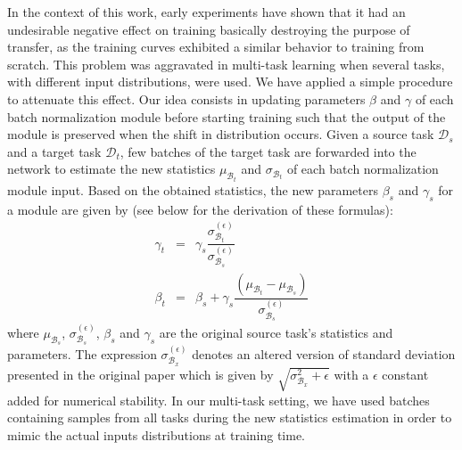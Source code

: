 In the context of this work, early experiments have shown that it had an undesirable negative effect on training basically destroying the purpose of transfer, as the training curves exhibited a similar behavior to training from scratch. This problem was aggravated in multi-task learning when several tasks, with different input distributions, were used. We have applied a simple procedure to attenuate this effect. Our idea consists in updating parameters $\beta$ and $\gamma$ of each batch normalization module before starting training such that the output of the module is preserved when the shift in distribution occurs. Given a source task $\mathcal{D}_s$ and a target task $\mathcal{D}_t$, few batches of the target task are forwarded into the network to estimate the new statistics $\mu_{\mathcal{B}_t}$ and $\sigma_{\mathcal{B}_t}$ of each batch normalization module input. Based on the obtained statistics, the new parameters $\beta_s$ and $\gamma_s$ for a module are given by (see below for the derivation of these formulas):
\begin{eqnarray}
\gamma_t &=& \gamma_s \dfrac{\sigma^{(\epsilon)}_{\mathcal{B}_t}}{\sigma^{(\epsilon)}_{\mathcal{B}_s}}\label{app:mtask:eqn:bn_update_gamma}\\
\beta_t &=& \beta_s + \gamma_s  \dfrac{(\mu_{\mathcal{B}_t}-\mu_{\mathcal{B}_s})}{\sigma^{(\epsilon)}_{\mathcal{B}_s}}\label{app:mtask:eqn:bn_update_beta}
\end{eqnarray}
where $\mu_{\mathcal{B}_s}$, $\sigma^{(\epsilon)}_{\mathcal{B}_s}$, $\beta_s$ and $\gamma_s$ are the original source task's statistics and parameters. The expression $\sigma^{(\epsilon)}_{\mathcal{B}_x}$ denotes an altered version of standard deviation presented in the original paper which is given by $\sqrt{\sigma_{\mathcal{B}_x}^2 + \epsilon}$ with a $\epsilon$ constant added for numerical stability. In our multi-task setting, we have used batches containing samples from all tasks during the new statistics estimation in order to mimic the actual inputs distributions at training time.

